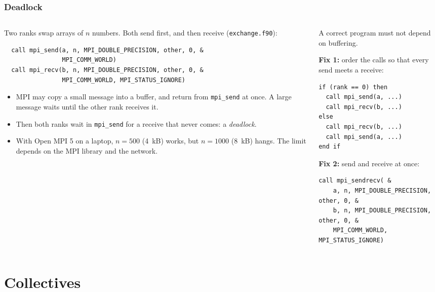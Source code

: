 \begin{frame}[fragile]
  \frametitle{Deadlock}
  \begin{columns}[T]
    \begin{column}{0.54\textwidth}
      Two ranks swap arrays of $n$ numbers. Both send first, and then receive (\texttt{exchange.f90}):
\begin{lstlisting}
  call mpi_send(a, n, MPI_DOUBLE_PRECISION, other, 0, &
                MPI_COMM_WORLD)
  call mpi_recv(b, n, MPI_DOUBLE_PRECISION, other, 0, &
                MPI_COMM_WORLD, MPI_STATUS_IGNORE)
\end{lstlisting}
      \begin{itemize}
        \item MPI may copy a small message into a buffer, and return from \texttt{mpi\_send} at once. A large message waits until the other rank receives it.
        \item Then both ranks wait in \texttt{mpi\_send} for a receive that never comes: a \emph{deadlock}.
        \item With Open MPI 5 on a laptop, $n = 500$ (4~kB) works, but $n = 1000$ (8~kB) hangs. The limit depends on the MPI library and the network.
      \end{itemize}
    \end{column}

    \begin{column}{0.46\textwidth}
      A correct program must not depend on buffering.

      \vspace*{1mm}
      \textbf{Fix 1:} order the calls so that every send meets a receive:
\begin{lstlisting}
if (rank == 0) then
  call mpi_send(a, ...)
  call mpi_recv(b, ...)
else
  call mpi_recv(b, ...)
  call mpi_send(a, ...)
end if
\end{lstlisting}

      \textbf{Fix 2:} send and receive at once:
\begin{lstlisting}
call mpi_sendrecv( &
    a, n, MPI_DOUBLE_PRECISION, other, 0, &
    b, n, MPI_DOUBLE_PRECISION, other, 0, &
    MPI_COMM_WORLD, MPI_STATUS_IGNORE)
\end{lstlisting}
    \end{column}
  \end{columns}
\end{frame}


\section{Collectives}

